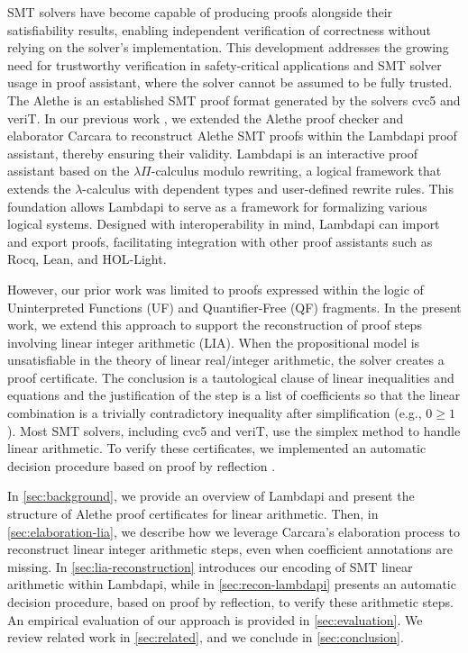 \documentclass[runningheads]{llncs}
\begin{document}
SMT solvers have become capable of producing proofs alongside their satisfiability results,  enabling independent verification of correctness without relying on the solver's implementation.
This development addresses the growing need for trustworthy verification in safety-critical applications and SMT solver usage in proof assistant, where the solver cannot be assumed to be fully trusted.
The Alethe \cite{alethe,alethespec} is an established SMT proof format generated by the solvers cvc5 and veriT. In our previous work \cite{ColtellacciMD24}, we extended the Alethe proof checker and elaborator Carcara \cite{carcara} to
reconstruct Alethe SMT proofs within the Lambdapi proof assistant, thereby ensuring their validity.
Lambdapi is an interactive proof assistant based on the $\lambda\Pi$-calculus modulo rewriting, a logical framework that extends the $\lambda$-calculus with dependent types and user-defined rewrite rules.
This foundation allows Lambdapi to serve as a framework for formalizing various logical systems.
Designed with interoperability in mind, Lambdapi can import and export proofs, facilitating integration with other proof assistants such as Rocq, Lean, and HOL-Light. 

However, our prior work was limited to proofs expressed within the logic of Uninterpreted Functions (UF) and Quantifier-Free (QF) fragments. 
In the present work, we extend this approach to support the reconstruction of proof steps involving linear integer arithmetic (LIA).
When the propositional model is unsatisfiable in the theory of linear real/integer arithmetic, the solver creates a proof certificate.
The conclusion is a tautological clause of linear inequalities and equations and the justification of the step is a list of coefficients so that the linear combination is a trivially contradictory inequality after simplification (e.g., $0 \geq 1$).
Most SMT solvers, including cvc5 and veriT, use the simplex method \cite{SRI:simplex:dpllt} to handle linear arithmetic.
To verify these certificates, we implemented an automatic decision procedure based on proof by reflection \cite{reflection-origin-coq,ring-coq}.

In \cref{sec:background}, we provide an overview of Lambdapi and present the structure of Alethe proof certificates for linear arithmetic.
Then, in \cref{sec:elaboration-lia}, we describe how we leverage Carcara's elaboration process to reconstruct linear integer arithmetic steps, even when coefficient annotations are missing.
In \cref{sec:lia-reconstruction} introduces our encoding of SMT linear arithmetic within Lambdapi, while in \cref{sec:recon-lambdapi} presents an automatic decision procedure, based on proof by reflection, to verify these arithmetic steps.
An empirical evaluation of our approach is provided in \cref{sec:evaluation}. We review related work in \cref{sec:related}, and we conclude in \cref{sec:conclusion}.
\end{document}
